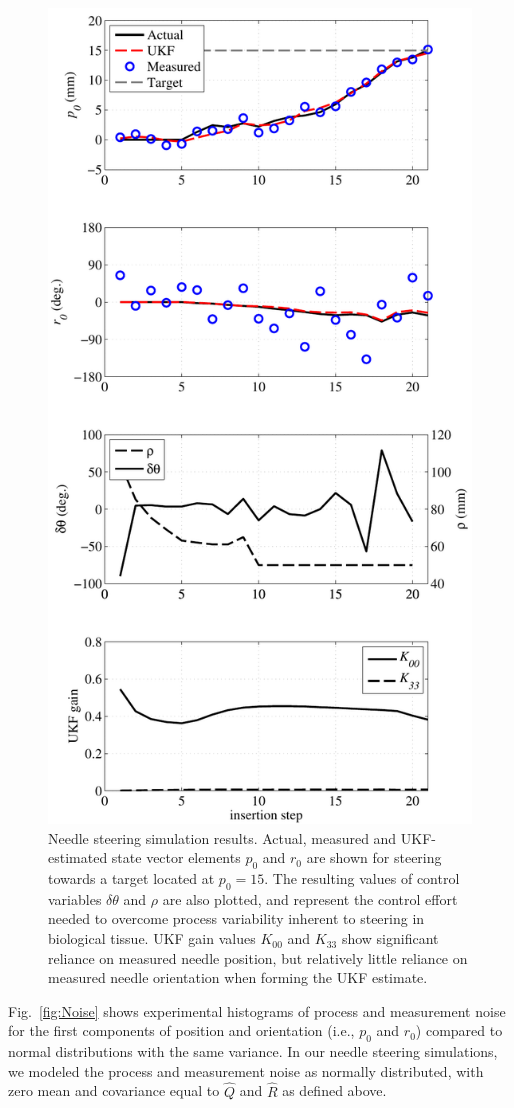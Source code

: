 \begin{figure}[!h]
\centering
\includegraphics[width=0.5\columnwidth]{Images/Chapter4/SimulationResults/SimulationResults}%
\caption[Needle steering simulation results with UKF.]{Needle steering simulation results. Actual, measured and UKF-estimated state vector elements $p_0$ and $r_0$ are shown for steering towards a target located at $p_0 = 15$. The resulting values of control variables $\delta\theta$ and $\rho$ are also plotted, and represent the control effort needed to overcome process variability inherent to steering in biological tissue. UKF gain values $K_{00}$ and $K_{33}$ show significant reliance on measured needle position, but relatively little reliance on measured needle orientation when forming the UKF estimate. }
\label{fig:SimulationResults}
\end{figure}   

Fig.~\ref{fig:Noise} shows experimental histograms of process and measurement noise for the first components of position and orientation (i.e., $p_0$ and $r_0$) compared to normal distributions with the same variance. In our needle steering simulations, we modeled the process and measurement noise as normally distributed, with zero mean and covariance equal to ${\hat{Q}}$ and ${\hat{R}}$ as defined above.

